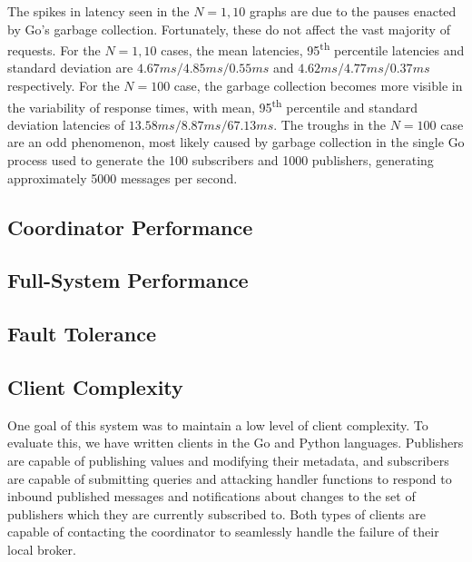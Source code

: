 The spikes in latency seen in the $N=1,10$ graphs are due to the pauses enacted by Go's garbage collection.
Fortunately, these do not affect the vast majority of requests.
For the $N=1,10$ cases, the mean latencies, 95\textsuperscript{th} percentile latencies and standard deviation are $4.67ms/4.85ms/0.55ms$ and $4.62ms/4.77ms/0.37ms$ respectively.
For the $N=100$ case, the garbage collection becomes more visible in the variability of response times, with mean, 95\textsuperscript{th} percentile and standard deviation latencies of $13.58ms/8.87ms/67.13ms$.
The troughs in the $N=100$ case are an odd phenomenon, most likely caused by garbage collection in the single Go process used to generate the 100 subscribers and 1000 publishers, generating approximately 5000 messages per second.

\subsection{Coordinator Performance}


\subsection{Full-System Performance}


\subsection{Fault Tolerance}


\subsection{Client Complexity}

One goal of this system was to maintain a low level of client complexity.
To evaluate this, we have written clients in the Go and Python languages.
Publishers are capable of publishing values and modifying their metadata, and subscribers are capable of submitting queries and attacking handler functions to respond to inbound published messages and notifications about changes to the set of publishers which they are currently subscribed to.
Both types of clients are capable of contacting the coordinator to seamlessly handle the failure of their local broker.


